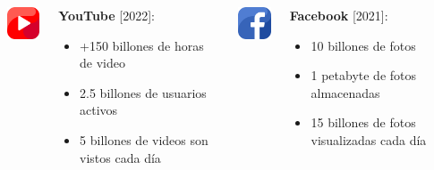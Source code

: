 \begin{frame}
    \begin{columns}[T] %

        \begin{column}{.48\textwidth}

            \begin{columns}[T] %
                \begin{column}{0.20\textwidth}
                    \includegraphics[width=1.4cm]{img/youtube.png}
                \end{column}
                \begin{column}{0.78\textwidth}
                    \large \textbf{YouTube} [2022]:
                    \begin{itemize}
                        \item \small +150 billones de horas de video
                        \item  \small 2.5 billones de usuarios activos
                        \item \small 5 billones de videos son vistos cada d\'ia
                    \end{itemize}
                \end{column}
            \end{columns}

        \end{column}


        \begin{column}{.48\textwidth}

            \begin{columns}[T] %
                \begin{column}{0.20\textwidth}
                    \includegraphics[width=1.4cm]{img/facebook.png}
                \end{column}
                \begin{column}{0.78\textwidth}
                    \large \textbf{Facebook} [2021]:
                    \begin{itemize}
                        \item \small 10 billones de fotos
                        \item \small 1 petabyte de fotos almacenadas
                        \item \small 15 billones de fotos visualizadas cada d\'ia
                    \end{itemize}
                \end{column}
            \end{columns}


\end{column}
\end{columns}
\end{frame}
